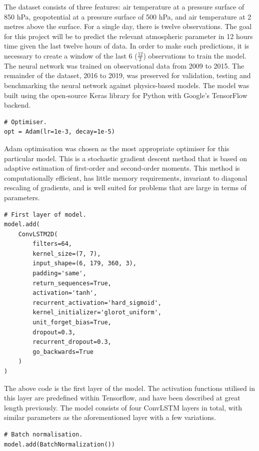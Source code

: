 The dataset consists of three features: air temperature at a pressure surface of 850 hPa, geopotential at a pressure surface of 500 hPa, and air temperature at 2 metres above the surface. For a single day, there is twelve observations. The goal for this project will be to predict the relevant atmospheric parameter in 12 hours time given the last twelve hours of data. In order to make such predictions, it is necessary to create a window of the last 6 ($\frac{12}{2}$) observations to train the model\cite{time_series}. The neural network was trained on observational data from 2009 to 2015. The remainder of the dataset, 2016 to 2019, was preserved for validation, testing and benchmarking the neural network against physics-based models. The model was built using the open‐source Keras library for Python with Google's TensorFlow backend\cite{numerical_stability}.

\begin{verbatim}
# Optimiser.
opt = Adam(lr=1e-3, decay=1e-5)
\end{verbatim}

Adam optimisation was chosen as the most appropriate optimiser for this particular model. This is a stochastic gradient descent method that is based on adaptive estimation of first-order and second-order moments. This method is computationally efficient, has little memory requirements, invariant to diagonal rescaling of gradients, and is well suited for problems that are large in terms of parameters.

\begin{verbatim}
# First layer of model.
model.add(
    ConvLSTM2D(
        filters=64, 
        kernel_size=(7, 7),
        input_shape=(6, 179, 360, 3), 
        padding='same', 
        return_sequences=True, 
        activation='tanh', 
        recurrent_activation='hard_sigmoid',
        kernel_initializer='glorot_uniform', 
        unit_forget_bias=True, 
        dropout=0.3, 
        recurrent_dropout=0.3, 
        go_backwards=True
    )
)
\end{verbatim}

The above code is the first layer of the model. The activation functions utilised in this layer are predefined within Tensorflow, and have been described at great length previously. The model consists of four ConvLSTM layers in total, with similar parameters as the aforementioned layer with a few variations.

\begin{verbatim}
# Batch normalisation.
model.add(BatchNormalization())
\end{verbatim}

